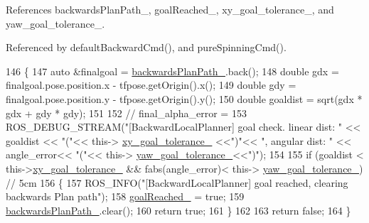 References backwards\+Plan\+Path\+\_\+, goal\+Reached\+\_\+, xy\+\_\+goal\+\_\+tolerance\+\_\+, and yaw\+\_\+goal\+\_\+tolerance\+\_\+.



Referenced by default\+Backward\+Cmd(), and pure\+Spinning\+Cmd().


\begin{DoxyCode}
146 \{
147     \textcolor{keyword}{auto} &finalgoal = \hyperlink{classcl__move__base__z_1_1backward__local__planner_1_1BackwardLocalPlanner_ad9cde5c85f782cab2ddb4030e3c3f2cf}{backwardsPlanPath\_}.back();
148     \textcolor{keywordtype}{double} gdx = finalgoal.pose.position.x - tfpose.getOrigin().x();
149     \textcolor{keywordtype}{double} gdy = finalgoal.pose.position.y - tfpose.getOrigin().y();
150     \textcolor{keywordtype}{double} goaldist = sqrt(gdx * gdx + gdy * gdy);
151 
152     \textcolor{comment}{// final\_alpha\_error = }
153     ROS\_DEBUG\_STREAM(\textcolor{stringliteral}{"[BackwardLocalPlanner] goal check. linear dist: "} << goaldist << \textcolor{stringliteral}{"("}<< this->
      \hyperlink{classcl__move__base__z_1_1backward__local__planner_1_1BackwardLocalPlanner_aa4ec2c87947a3c08f8278eff052e7c8c}{xy\_goal\_tolerance\_} <<\textcolor{stringliteral}{")"}<< \textcolor{stringliteral}{", angular dist: "} << angle\_error<< \textcolor{stringliteral}{"("}<< this->
      \hyperlink{classcl__move__base__z_1_1backward__local__planner_1_1BackwardLocalPlanner_a9c5104d328041fcde5a3c02664abad48}{yaw\_goal\_tolerance\_}<<\textcolor{stringliteral}{")"});
154 
155     \textcolor{keywordflow}{if} (goaldist < this->\hyperlink{classcl__move__base__z_1_1backward__local__planner_1_1BackwardLocalPlanner_aa4ec2c87947a3c08f8278eff052e7c8c}{xy\_goal\_tolerance\_} &&  fabs(angle\_error)< this->
      \hyperlink{classcl__move__base__z_1_1backward__local__planner_1_1BackwardLocalPlanner_a9c5104d328041fcde5a3c02664abad48}{yaw\_goal\_tolerance\_}) \textcolor{comment}{// 5cm}
156     \{
157         ROS\_INFO(\textcolor{stringliteral}{"[BackwardLocalPlanner] goal reached, clearing backwards Plan path"});
158         \hyperlink{classcl__move__base__z_1_1backward__local__planner_1_1BackwardLocalPlanner_ad443c52ef585a8eab0364f0909222f51}{goalReached\_} = \textcolor{keyword}{true};
159         \hyperlink{classcl__move__base__z_1_1backward__local__planner_1_1BackwardLocalPlanner_ad9cde5c85f782cab2ddb4030e3c3f2cf}{backwardsPlanPath\_}.clear();
160         \textcolor{keywordflow}{return} \textcolor{keyword}{true};
161     \}
162 
163     \textcolor{keywordflow}{return} \textcolor{keyword}{false};
164 \}
\end{DoxyCode}
